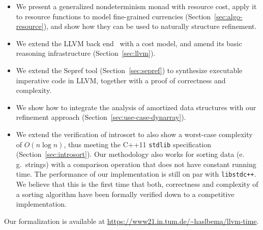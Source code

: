 \documentclass[acmsmall]{acmart}
\newcommand{\is}{\lstinline[language=isabelle]}
\newcommand{\eg}{e.\,g.\xspace}
\begin{document}
\renewcommand{\labelitemi}{$\bullet$} %
\begin{itemize}

\item We present a generalized nondeterminism monad with resource cost, apply it to resource functions to model fine-grained currencies (Section~\ref{sec:algo-resource}), and show how they can be used to naturally structure refinement.
\item We extend the LLVM back end~\cite{lammich2019LLVM} with a cost model, and amend its basic reasoning infrastructure (Section~\ref{sec:llvm}).

\item We extend the Sepref tool (Section~\ref{sec:sepref}) to synthesize executable imperative code in LLVM, together with a proof of correctness and complexity. 

\item We show how to integrate the analysis of amortized data structures with our refinement approach (Section~\ref{sec:use-case-dynarray}).

\item We extend the verification of introsort to also show a worst-case complexity of $O(n \log n)$, thus meeting the C++11 \is{stdlib} specification~\cite{stdlib-sort} (Section~\ref{sec:introsort}). 
Our methodology also works for sorting data (\eg\ strings) with a comparison operation that does not have constant running time. %
%
The performance of our implementation is still on par with \is{libstdc++}.
We believe that this is the first time that both, correctness and complexity of a sorting algorithm have been formally verified down to a competitive implementation.

\end{itemize}
\renewcommand{\labelitemi}{--}

Our formalization is available at \url{https://www21.in.tum.de/~haslbema/llvm-time}.
\begin{comment}
The rest of this paper is organized as follows.
First, we introduce the generalized nondeterminism monad with resource cost (NREST) that is used to model abstract algorithmic ideas (Section~\ref{sec:algo-resource}).
Then, we present our shallow embedded LLVM semantics and its basic reasoning infrastrucutre (Section~\ref{sec:llvm}).
The automatic synthesis procedure Sepref connects the abstract with the concrete level (Section~\ref{sec:sepref}).
Finally, we present two case studies:
First, we provide an verification of strings as dynamic arrays that come with an amortized constant time push operation.
Then, we present our verification of the introsort algorithm (Section~\ref{sec:introsort}) that is applied to sorting integers as well as strings (Section~\ref{sec:sorting_strings}).
In Section~\ref{sec:benchmarks} present benchmarks that show that our synthesized implementation of introsort is competitive with state-of-the-art code.
Finally, we conclude the paper and state related and future work (Section~\ref{sec:conclusion}).
\end{comment}
\end{document}
